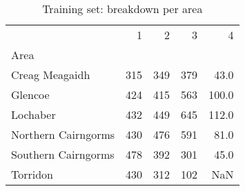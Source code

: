 \begin{table}[H]
\caption{Training set:  breakdown per area}
\label{tbl:sais_mapped_hazard_breakdown_per_area_train}
\begin{tabular}{lrrrr}
\toprule
 & 1 & 2 & 3 & 4 \\
Area &  &  &  &  \\
\midrule
Creag Meagaidh & 315 & 349 & 379 & 43.0 \\
Glencoe & 424 & 415 & 563 & 100.0 \\
Lochaber & 432 & 449 & 645 & 112.0 \\
Northern Cairngorms & 430 & 476 & 591 & 81.0 \\
Southern Cairngorms & 478 & 392 & 301 & 45.0 \\
Torridon & 430 & 312 & 102 & NaN \\
\bottomrule
\end{tabular}
\end{table}
